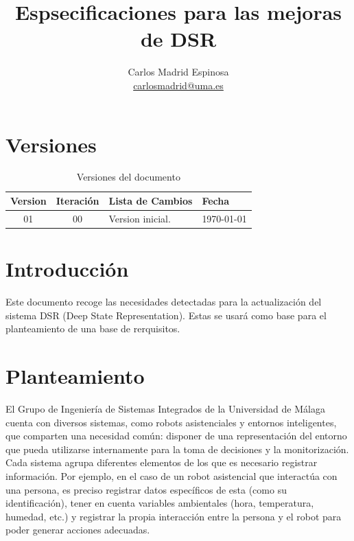 \documentclass{article}
\title{Espsecificaciones para las mejoras de DSR}
\author{
        Carlos Madrid Espinosa \\
        \href{mailto:carlosmadrid@uma.es}{carlosmadrid@uma.es}
}
\begin{document}
\maketitle

\section*{Versiones}\label{sec:ver}

\begin{table}[h]\label{tab:ver-versions}
        \begin{tabular}{ccll}
                \toprule
                Version & Iteración & Lista de Cambios & Fecha  \\
                \midrule
                01      & 00        & Version inicial. & \today \\
                \bottomrule
        \end{tabular}
        \caption{Versiones del documento}
\end{table}

\tableofcontents

\newpage

\section{Introducción}\label{sec:intro}

Este documento recoge las necesidades detectadas para la actualización del
sistema DSR (Deep State Representation). Estas se usará como base para el
planteamiento de una base de rerquisitos.

\section{Planteamiento}\label{sec:scope}

El Grupo de Ingeniería de Sistemas Integrados de la Universidad de Málaga
cuenta con diversos sistemas, como robots asistenciales y entornos
inteligentes, que comparten una necesidad común: disponer de una representación
del entorno que pueda utilizarse internamente para la toma de decisiones y la
monitorización. Cada sistema agrupa diferentes elementos de los que es
necesario registrar información. Por ejemplo, en el caso de un robot
asistencial que interactúa con una persona, es preciso registrar datos
específicos de esta (como su identificación), tener en cuenta variables
ambientales (hora, temperatura, humedad, etc.) y registrar la propia
interacción entre la persona y el robot para poder generar acciones adecuadas.
\end{document}
